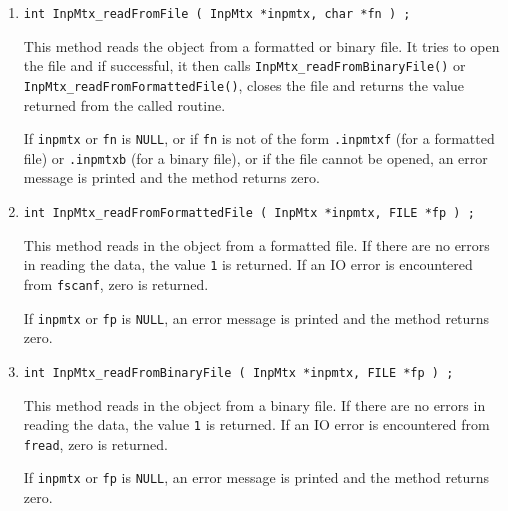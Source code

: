 \begin{enumerate}
\item
\begin{verbatim}
int InpMtx_readFromFile ( InpMtx *inpmtx, char *fn ) ;
\end{verbatim}
\par
This method reads the object from a formatted or binary file.
It  tries to open the file and if successful, 
it then calls 
{\tt InpMtx\_readFromBinaryFile()} 
or
{\tt InpMtx\_readFromFormattedFile()},
closes the file
and returns the value returned from the called routine.
\par {}
If {\tt inpmtx} or {\tt fn} is {\tt NULL},
or if {\tt fn} is not of the form
{\tt *.inpmtxf} (for a formatted file) 
or {\tt *.inpmtxb} (for a binary file),
or if the file cannot be opened,
an error message is printed and the method returns zero.
\item
\begin{verbatim}
int InpMtx_readFromFormattedFile ( InpMtx *inpmtx, FILE *fp ) ;
\end{verbatim}
\par
This method reads in the object from a formatted file.
If there are no errors in reading the data, 
the value {\tt 1} is returned.
If an IO error is encountered from {\tt fscanf}, zero is returned.
\par {}
If {\tt inpmtx} or {\tt fp} is {\tt NULL},
an error message is printed and the method returns zero.
\item
\begin{verbatim}
int InpMtx_readFromBinaryFile ( InpMtx *inpmtx, FILE *fp ) ;
\end{verbatim}
\par
This method reads in the object from a binary file.
If there are no errors in reading the data, 
the value {\tt 1} is returned.
If an IO error is encountered from {\tt fread}, zero is returned.
\par {}
If {\tt inpmtx} or {\tt fp} is {\tt NULL},
an error message is printed and the method returns zero.

\end{enumerate}
